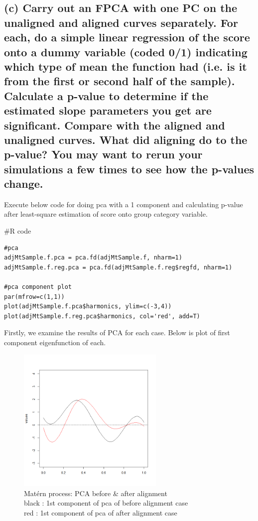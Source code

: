 \documentclass{article}
\newenvironment{Rcode}%
{%
    \begin{mdframed}
    \#R code
    \begin{small}
}
{%
    \end{small}
    \end{mdframed}
}
\begin{document}
\subsection*{(c) Carry out an FPCA with one PC on the unaligned and aligned curves separately. 
For each, do a simple linear regression of the score onto a dummy variable (coded 0/1) 
indicating which type of mean the function had (i.e. is it from the first or second half of the sample). 
Calculate a p-value to determine if the estimated slope parameters you get are significant. 
Compare with the aligned and unaligned curves. What did aligning do to the p-value? 
You may want to rerun your simulations a few times to see how the p-values change.}

Execute below code for doing pca with a 1 component and calculating p-value after least-square estimation of score onto group category variable.
\begin{Rcode}
    \begin{verbatim}
#pca
adjMtSample.f.pca = pca.fd(adjMtSample.f, nharm=1)
adjMtSample.f.reg.pca = pca.fd(adjMtSample.f.reg$regfd, nharm=1)

#pca component plot
par(mfrow=c(1,1))
plot(adjMtSample.f.pca$harmonics, ylim=c(-3,4))
plot(adjMtSample.f.reg.pca$harmonics, col='red', add=T)
    \end{verbatim}
\end{Rcode}

Firstly, we examine the results of PCA for each case. Below is plot of first component eigenfunction of each.

\begin{figure}[hh]
    \centering
    \includegraphics[height=7cm]{matern_pca_component.png}
    \caption{Mat\'{e}rn process: PCA before \& after alignment \\
    black : 1st component of pca of before alignment case\\
    red : 1st component of pca of after alignment case}
\end{figure}
\end{document}
